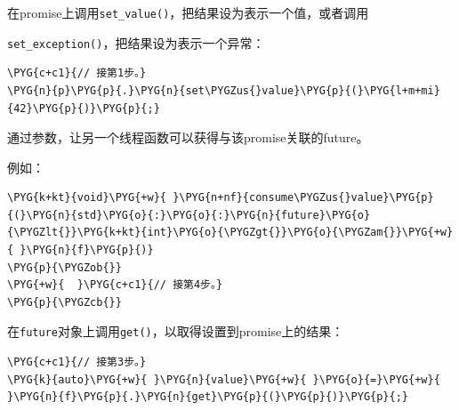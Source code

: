 
在promise上调用\texttt{set\_\allowbreak{}value()}，把结果设为表示一个值，或者调用



\texttt{set\_\allowbreak{}exception()}，把结果设为表示一个异常：



\begin{codeblockbg}
\begin{Verbatim}[commandchars=\\\{\},breaklines=true,breakanywhere=true,fontsize=\codefont,xleftmargin=17bp]
\PYG{c+c1}{// 接第1步。}
\PYG{n}{p}\PYG{p}{.}\PYG{n}{set\PYGZus{}value}\PYG{p}{(}\PYG{l+m+mi}{42}\PYG{p}{)}\PYG{p}{;}
\end{Verbatim}
\end{codeblockbg}



通过参数，让另一个线程函数可以获得与该promise关联的future。



例如：



\begin{codeblockbg}
\begin{Verbatim}[commandchars=\\\{\},breaklines=true,breakanywhere=true,fontsize=\codefont,xleftmargin=17bp]
\PYG{k+kt}{void}\PYG{+w}{ }\PYG{n+nf}{consume\PYGZus{}value}\PYG{p}{(}\PYG{n}{std}\PYG{o}{:}\PYG{o}{:}\PYG{n}{future}\PYG{o}{\PYGZlt{}}\PYG{k+kt}{int}\PYG{o}{\PYGZgt{}}\PYG{o}{\PYGZam{}}\PYG{+w}{ }\PYG{n}{f}\PYG{p}{)}
\PYG{p}{\PYGZob{}}
\PYG{+w}{  }\PYG{c+c1}{// 接第4步。}
\PYG{p}{\PYGZcb{}}
\end{Verbatim}
\end{codeblockbg}



在\texttt{future}对象上调用\texttt{get()}，以取得设置到promise上的结果：



\begin{codeblockbg}
\begin{Verbatim}[commandchars=\\\{\},breaklines=true,breakanywhere=true,fontsize=\codefont,xleftmargin=17bp]
\PYG{c+c1}{// 接第3步。}
\PYG{k}{auto}\PYG{+w}{ }\PYG{n}{value}\PYG{+w}{ }\PYG{o}{=}\PYG{+w}{ }\PYG{n}{f}\PYG{p}{.}\PYG{n}{get}\PYG{p}{(}\PYG{p}{)}\PYG{p}{;}
\end{Verbatim}
\end{codeblockbg}


